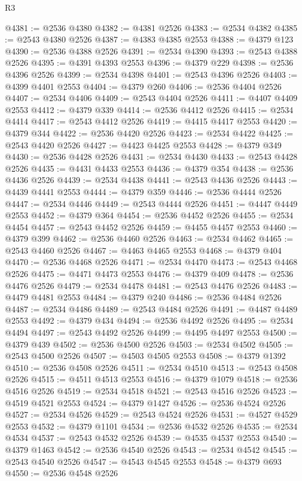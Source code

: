 \begin{lexlean}{R3}
\begin{coremodule}
@4381 := @2536 @4380
@4382 := @4381 @2526
@4383 := @2534 @4382
@4385 := @2543 @4380 @2526
@4387 := @4383 @4385 @2553
@4388 := @4379 @123
@4390 := @2536 @4388 @2526
@4391 := @2534 @4390
@4393 := @2543 @4388 @2526
@4395 := @4391 @4393 @2553
@4396 := @4379 @229
@4398 := @2536 @4396 @2526
@4399 := @2534 @4398
@4401 := @2543 @4396 @2526
@4403 := @4399 @4401 @2553
@4404 := @4379 @260
@4406 := @2536 @4404 @2526
@4407 := @2534 @4406
@4409 := @2543 @4404 @2526
@4411 := @4407 @4409 @2553
@4412 := @4379 @339
@4414 := @2536 @4412 @2526
@4415 := @2534 @4414
@4417 := @2543 @4412 @2526
@4419 := @4415 @4417 @2553
@4420 := @4379 @344
@4422 := @2536 @4420 @2526
@4423 := @2534 @4422
@4425 := @2543 @4420 @2526
@4427 := @4423 @4425 @2553
@4428 := @4379 @349
@4430 := @2536 @4428 @2526
@4431 := @2534 @4430
@4433 := @2543 @4428 @2526
@4435 := @4431 @4433 @2553
@4436 := @4379 @354
@4438 := @2536 @4436 @2526
@4439 := @2534 @4438
@4441 := @2543 @4436 @2526
@4443 := @4439 @4441 @2553
@4444 := @4379 @359
@4446 := @2536 @4444 @2526
@4447 := @2534 @4446
@4449 := @2543 @4444 @2526
@4451 := @4447 @4449 @2553
@4452 := @4379 @364
@4454 := @2536 @4452 @2526
@4455 := @2534 @4454
@4457 := @2543 @4452 @2526
@4459 := @4455 @4457 @2553
@4460 := @4379 @399
@4462 := @2536 @4460 @2526
@4463 := @2534 @4462
@4465 := @2543 @4460 @2526
@4467 := @4463 @4465 @2553
@4468 := @4379 @404
@4470 := @2536 @4468 @2526
@4471 := @2534 @4470
@4473 := @2543 @4468 @2526
@4475 := @4471 @4473 @2553
@4476 := @4379 @409
@4478 := @2536 @4476 @2526
@4479 := @2534 @4478
@4481 := @2543 @4476 @2526
@4483 := @4479 @4481 @2553
@4484 := @4379 @240
@4486 := @2536 @4484 @2526
@4487 := @2534 @4486
@4489 := @2543 @4484 @2526
@4491 := @4487 @4489 @2553
@4492 := @4379 @434
@4494 := @2536 @4492 @2526
@4495 := @2534 @4494
@4497 := @2543 @4492 @2526
@4499 := @4495 @4497 @2553
@4500 := @4379 @439
@4502 := @2536 @4500 @2526
@4503 := @2534 @4502
@4505 := @2543 @4500 @2526
@4507 := @4503 @4505 @2553
@4508 := @4379 @1392
@4510 := @2536 @4508 @2526
@4511 := @2534 @4510
@4513 := @2543 @4508 @2526
@4515 := @4511 @4513 @2553
@4516 := @4379 @1079
@4518 := @2536 @4516 @2526
@4519 := @2534 @4518
@4521 := @2543 @4516 @2526
@4523 := @4519 @4521 @2553
@4524 := @4379 @1427
@4526 := @2536 @4524 @2526
@4527 := @2534 @4526
@4529 := @2543 @4524 @2526
@4531 := @4527 @4529 @2553
@4532 := @4379 @1101
@4534 := @2536 @4532 @2526
@4535 := @2534 @4534
@4537 := @2543 @4532 @2526
@4539 := @4535 @4537 @2553
@4540 := @4379 @1463
@4542 := @2536 @4540 @2526
@4543 := @2534 @4542
@4545 := @2543 @4540 @2526
@4547 := @4543 @4545 @2553
@4548 := @4379 @693
@4550 := @2536 @4548 @2526

\end{coremodule}
\end{lexlean}
